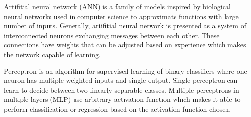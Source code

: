 \documentclass[12pt, oneside]{book}
\begin{document}
    Artifitial neural network (ANN) is a family of models inspired by biological
    neural networks used in computer science to approximate functions with
    large number of inputs. Generally, artifitial neural network is presented
    as a system of interconnected neurons exchanging messages between each
    other. These connections have weights that can be adjusted based on
    experience which makes the network capable of learning.

    Perceptron is an algorithm for supervised learning of binary classifiers
    where one neuron has multiple weighted inputs and single output. Single
    perceptron can learn to decide between two linearly separable
    classes. Multiple perceptrons in multiple layers (MLP) use arbitrary
    activation function which makes it able to perform classification or
    regression based on the activation function chosen.

\renewcommand\bibname{References}


\end{document}
